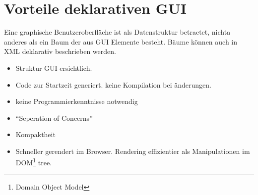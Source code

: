 \documentclass[a4paper,10pt]{scrreprt}
\begin{document}
\section{Vorteile deklarativen GUI}
Eine graphische Benutzeroberfläche ist als Datenstruktur betractet, nichta anderes als ein Baum der aus GUI Elemente 
besteht. Bäume können auch in XML deklarativ beschrieben werden. 
\begin{itemize}
 \item Struktur GUI ersichtlich.
 \item Code zur Startzeit generiert. keine Kompilation bei änderungen.
 \item keine Programmierkenntnisse notwendig
 \item ``Seperation of Concerns''
 \item Kompaktheit
 \item Schneller gerendert im Browser. Rendering effizientier als Manipulationen im DOM\footnote{Domain Object Model} 
tree.
\end{itemize}
\end{document}
